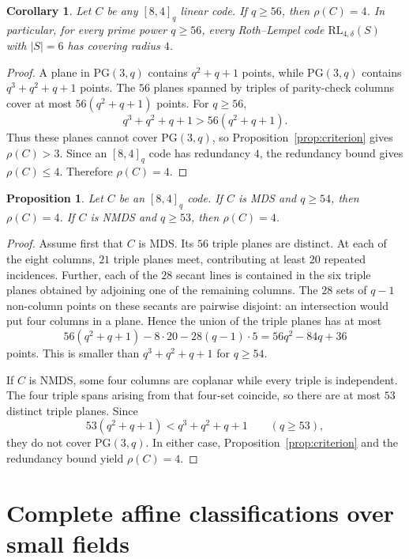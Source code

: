 ﻿\documentclass[11pt]{article}
\newcommand{\PG}{\mathrm{PG}}
\newcommand{\RL}{\mathrm{RL}}
\theoremstyle{plain}
\newtheorem{proposition}[theorem]{Proposition}
\newtheorem{corollary}[theorem]{Corollary}
\theoremstyle{definition}
\begin{document}
\begin{corollary}\label{cor:large-q}
Let \(C\) be any \([8,4]_q\) linear code.  If \(q\ge 56\), then
\(\rho(C)=4\).  In particular, for every prime power \(q\ge 56\), every
Roth--Lempel code \(\RL_{4,\delta}(S)\) with \(|S|=6\) has covering radius
\(4\).
\end{corollary}

\begin{proof}
A plane in \(\PG(3,q)\) contains \(q^2+q+1\) points, while
\(\PG(3,q)\) contains \(q^3+q^2+q+1\) points.  The \(56\) planes spanned by
triples of parity-check columns cover at most \(56(q^2+q+1)\) points.  For
\(q\ge 56\),
\[
  q^3+q^2+q+1>56(q^2+q+1).
\]
Thus these planes cannot cover \(\PG(3,q)\), so
Proposition~\ref{prop:criterion} gives \(\rho(C)>3\).  Since an \([8,4]_q\)
code has redundancy \(4\), the redundancy bound gives \(\rho(C)\le 4\).
Therefore \(\rho(C)=4\).
\end{proof}

\begin{proposition}\label{prop:large-q-refined}
Let \(C\) be an \([8,4]_q\) code.  If \(C\) is MDS and \(q\ge54\), then
\(\rho(C)=4\).  If \(C\) is NMDS and \(q\ge53\), then
\(\rho(C)=4\).
\end{proposition}

\begin{proof}
Assume first that \(C\) is MDS\@.  Its \(56\) triple planes are distinct.  At
each of the eight columns, \(21\) triple planes meet, contributing at least
\(20\) repeated incidences.  Further, each of the \(28\) secant lines is
contained in the six triple planes obtained by adjoining one of the remaining
columns.  The \(28\) sets of \(q-1\) non-column points on these secants are
pairwise disjoint: an intersection would put four columns in a plane.  Hence
the union of the triple planes has at most
\[
  56(q^2+q+1)-8\cdot20-28(q-1)\cdot5
  =56q^2-84q+36
\]
points.  This is smaller than \(q^3+q^2+q+1\) for \(q\ge54\).

If \(C\) is NMDS, some four columns are coplanar while every triple is
independent.  The four triple spans arising from that four-set coincide, so
there are at most \(53\) distinct triple planes.  Since
\[
  53(q^2+q+1)<q^3+q^2+q+1\qquad(q\ge53),
\]
they do not cover \(\PG(3,q)\).  In either case,
Proposition~\ref{prop:criterion} and the redundancy bound yield
\(\rho(C)=4\).
\end{proof}

\section{Complete affine classifications over small fields}
\end{document}
